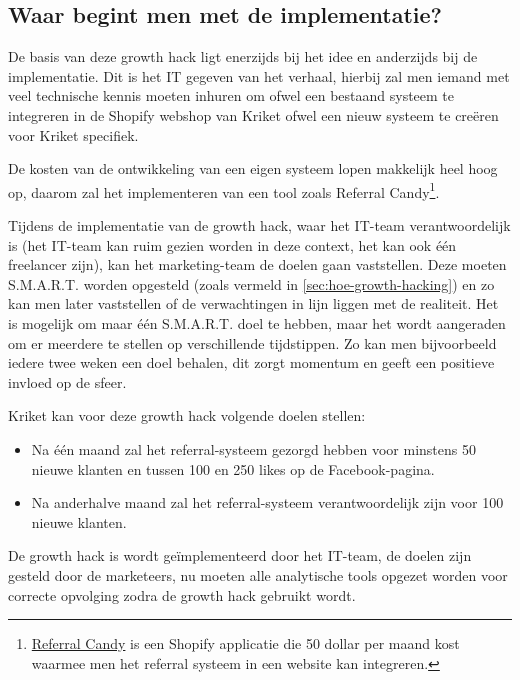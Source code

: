 \subsection{Waar begint men met de implementatie?}
\label{subsec:begin-implementatie}
De basis van deze growth hack ligt enerzijds bij het idee en anderzijds bij de implementatie. Dit is het IT gegeven van het verhaal, hierbij zal men iemand met veel technische kennis moeten inhuren om ofwel een bestaand systeem te integreren in de Shopify webshop van Kriket ofwel een nieuw systeem te creëren voor Kriket specifiek.

De kosten van de ontwikkeling van een eigen systeem lopen makkelijk heel hoog op, daarom zal het implementeren van een tool zoals Referral Candy\footnote{\href{https://apps.shopify.com/referralcandy}{Referral Candy} is een Shopify applicatie die 50 dollar per maand kost waarmee men het referral systeem in een website kan integreren.}. 

Tijdens de implementatie van de growth hack, waar het IT-team verantwoordelijk is (het IT-team kan ruim gezien worden in deze context, het kan ook één freelancer zijn), kan het marketing-team de doelen gaan vaststellen. Deze moeten S.M.A.R.T. worden opgesteld (zoals vermeld in \ref{sec:hoe-growth-hacking}) en zo kan men later vaststellen of de verwachtingen in lijn liggen met de realiteit. Het is mogelijk om maar één S.M.A.R.T. doel te hebben, maar het wordt aangeraden om er meerdere te stellen op verschillende tijdstippen. Zo kan men bijvoorbeeld iedere twee weken een doel behalen, dit zorgt momentum en geeft een positieve invloed op de sfeer.

Kriket kan voor deze growth hack volgende doelen stellen:
\begin{itemize}
	\item Na één maand zal het referral-systeem gezorgd hebben voor minstens 50 nieuwe klanten en tussen 100 en 250 likes op de Facebook-pagina.
	\item Na anderhalve maand zal het referral-systeem verantwoordelijk zijn voor 100 nieuwe klanten.
\end{itemize}

De growth hack is wordt geïmplementeerd door het IT-team, de doelen zijn gesteld door de marketeers, nu moeten alle analytische tools opgezet worden voor correcte opvolging zodra de growth hack gebruikt wordt.

